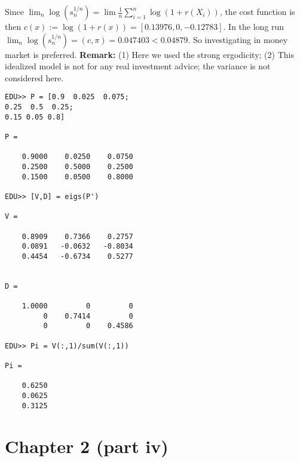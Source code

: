 \documentclass[  11pt]{article}
\begin{document}
\begin{ExerciseList}
 Since 
 $ \lim_n \log (s_n^{1/n})= \lim \frac{1}{n} \sum_{i=1}^n \log (1+r(X_i))$,
the cost function is then $c(x):=\log (1+r(x))= [ 0.13976       ,     0,     -0.12783]$.
 In the long run $\lim_n \log (s_n^{1/n}) = (c,\pi) = 0.047403 < 0.04879$. 
 So investigating in money market is preferred.
{\bf Remark:} (1) Here we used the strong ergodicity;
(2) This idealized model is not for any real investment advice;
the variance is not considered here.
\vspace{1\baselineskip}
\begin{lstlisting}
EDU>> P = [0.9  0.025  0.075;
0.25  0.5  0.25;
0.15 0.05 0.8]

P =

    0.9000    0.0250    0.0750
    0.2500    0.5000    0.2500
    0.1500    0.0500    0.8000

EDU>> [V,D] = eigs(P')

V =

    0.8909    0.7366    0.2757
    0.0891   -0.0632   -0.8034
    0.4454   -0.6734    0.5277


D =

    1.0000         0         0
         0    0.7414         0
         0         0    0.4586

EDU>> Pi = V(:,1)/sum(V(:,1))

Pi =

    0.6250
    0.0625
    0.3125

\end{lstlisting}



\end{ExerciseList}




\newpage
\section*{Chapter 2 (part iv)}
\setcounter{Exercise}{0}
\end{document}
